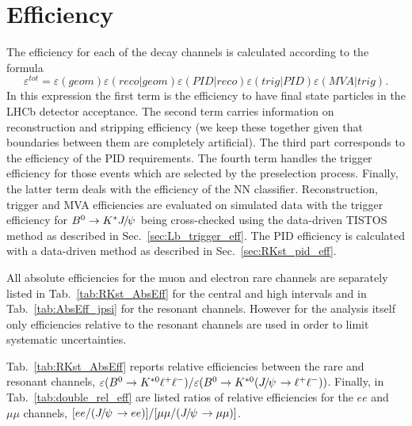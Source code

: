 \section{Efficiency}
\label{sec:RKst_efficiency}

The efficiency for each of the decay channels is calculated according to the formula
\begin{equation}
\varepsilon^{tot}=\varepsilon(geom)\varepsilon(reco|geom)\varepsilon(PID|reco)\varepsilon(trig|PID)\varepsilon(MVA|trig).
\end{equation}
In this expression the first term is the efficiency to have final state particles in the LHCb detector 
acceptance. The second term carries information on reconstruction and stripping efficiency
(we keep these together given that boundaries between them are completely artificial).
The third part corresponds to the efficiency of the PID requirements.
The fourth term handles the trigger efficiency for those events which are selected by the preselection process.
Finally, the latter term deals with the efficiency of the NN classifier.
Reconstruction, trigger and MVA efficiencies are evaluated on simulated data with the trigger efficiency
for $\Bz\to\Kstar\jpsi$ being cross-checked using the data-driven TISTOS method as described in Sec.~\ref{sec:Lb_trigger_eff}.
The PID efficiency is calculated with a data-driven method as described in Sec.~\ref{sec:RKst_pid_eff}.

All absolute efficiencies for the muon and electron rare channels are separately listed in Tab.~\ref{tab:RKst_AbsEff}
for the central and high \qsq intervals and in Tab.~\ref{tab:AbsEff_jpsi} for the resonant channels.
However for the analysis itself only efficiencies relative to the resonant channels are used in order
to limit systematic uncertainties.

Tab.~\ref{tab:RKst_AbsEff} reports relative efficiencies between the rare and resonant channels,
$\varepsilon(\Bz\to\Kstarz \ll)/\varepsilon(\Bz\to\Kstarz(\jpsi\to \ll))$.
Finally, in Tab.~\ref{tab:double_rel_eff} are listed ratios of relative efficiencies
for the $ee$ and $\mu\mu$ channels, $[ee/(\jpsi \to ee)] / [\mu\mu/(\jpsi\to \mu\mu)]$.

